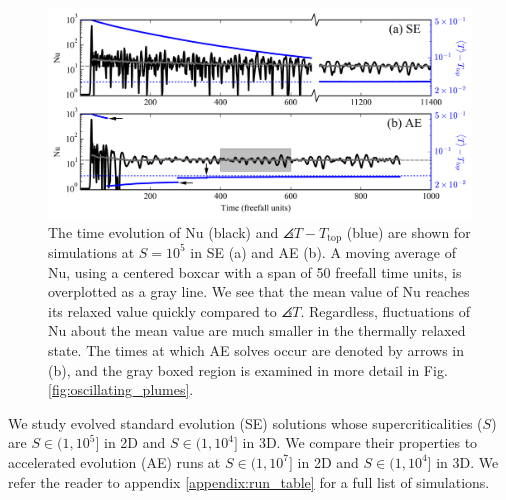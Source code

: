 \begin{figure}[bt!]
\includegraphics[width=\textwidth]{./figs/nu_v_time.pdf}
\caption[Time evolution of the Nusselt number in AE vs SE]{The time evolution of Nu (black) and $\angles{T} - T_{\text{top}}$ (blue)
are shown for simulations at $S = 10^5$ in SE (a) and AE (b).
A moving average of Nu, using a centered boxcar with a span of 50 freefall time
units, is overplotted as a gray line. 
We see that the mean value of Nu reaches its relaxed value quickly
compared to $\angles{T}$.
Regardless, fluctuations of Nu about the mean
value are much smaller in the thermally relaxed state.
The times at which AE solves occur are denoted by arrows in (b),
and the gray boxed region is examined in more detail in Fig. \ref{fig:oscillating_plumes}.
\label{fig:nu_v_time} }
\end{figure}


We study evolved standard evolution (SE) solutions whose supercriticalities ($S$) are 
$S \in (1, 10^5]$ in 2D and $S \in (1, 10^4]$ in
3D. We compare their properties to
accelerated evolution (AE) runs at $S \in (1, 10^7]$ in 2D and
$S \in (1, 10^4]$ in 3D.
We refer the reader to appendix \ref{appendix:run_table} for a full list of
simulations.


